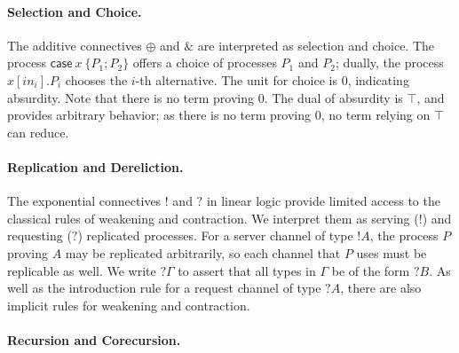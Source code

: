 \documentclass[orivec,envcountsame]{llncs}
\newcommand{\with}{\mathbin\binampersand}
\newcommand{\cpbang}[1]{{! #1}}
\newcommand{\cpquery}[1]{{? #1}}
\newcommand{\mkwd}[1]{\mathsf{#1}}
\newcommand{\clabel}[1]{\mathit{#1}}
\renewcommand{\case}[2]{\mkwd{case}\:#1\:\{#2\}}
\newcommand{\sel}[2]{#1[\clabel{#2}]}
\begin{document}
\paragraph{Selection and Choice.}

The additive connectives $\oplus$ and $\with$ are interpreted as selection and choice. The process
$\case{x}{P_1;P_2}$ offers a choice of processes $P_1$ and $P_2$; dually, the process
$\sel{x}{in_i}.P_i$ chooses the $i$-th alternative. The unit for choice is $0$, indicating
absurdity. Note that there is no term proving $0$. The dual of absurdity is $\top$, and provides
arbitrary behavior; as there is no term proving $0$, no term relying on $\top$ can reduce.

\paragraph{Replication and Dereliction.}

The exponential connectives $!$ and $?$ in linear logic provide limited access to the classical
rules of weakening and contraction. We interpret them as serving ($!$) and requesting ($?$)
replicated processes.
For a server channel of type $\cpbang{A}$, the process $P$ proving $A$ may be replicated
arbitrarily, so each channel that $P$ uses must be replicable as well. We write $\cpquery{\Gamma}$
to assert that all types in $\Gamma$ be of the form $\cpquery{B}$. As well as the introduction rule
for a request channel of type $\cpquery{A}$, there are also implicit rules for weakening and
contraction.

\paragraph{Recursion and Corecursion.}
\end{document}
